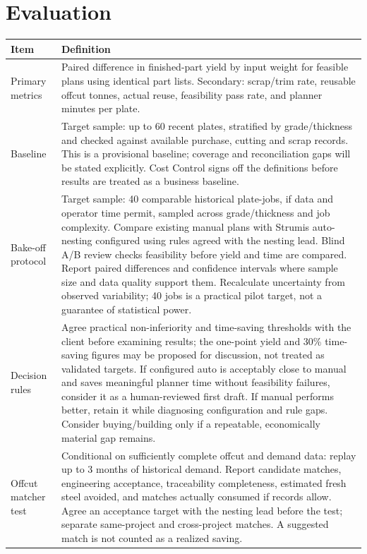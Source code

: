 \documentclass[10pt,a4paper]{article}
\begin{document}
\section{Evaluation}
\small
\begin{tabular}{@{}P{3.0cm}P{12.9cm}@{}}
\toprule
\textbf{Item} & \textbf{Definition} \\
\midrule
Primary metrics & Paired difference in finished-part yield by input weight for feasible plans using identical part lists. Secondary: scrap/trim rate, reusable offcut tonnes, actual reuse, feasibility pass rate, and planner minutes per plate. \\
Baseline & Target sample: up to 60 recent plates, stratified by grade/thickness and checked against available purchase, cutting and scrap records. This is a provisional baseline; coverage and reconciliation gaps will be stated explicitly. Cost Control signs off the definitions before results are treated as a business baseline. \\
Bake-off protocol & Target sample: 40 comparable historical plate-jobs, if data and operator time permit, sampled across grade/thickness and job complexity. Compare existing manual plans with Strumis auto-nesting configured using rules agreed with the nesting lead. Blind A/B review checks feasibility before yield and time are compared. Report paired differences and confidence intervals where sample size and data quality support them. Recalculate uncertainty from observed variability; 40 jobs is a practical pilot target, not a guarantee of statistical power. \\
Decision rules & Agree practical non-inferiority and time-saving thresholds with the client before examining results; the one-point yield and 30\% time-saving figures may be proposed for discussion, not treated as validated targets. If configured auto is acceptably close to manual and saves meaningful planner time without feasibility failures, consider it as a human-reviewed first draft. If manual performs better, retain it while diagnosing configuration and rule gaps. Consider buying/building only if a repeatable, economically material gap remains. \\
Offcut matcher test & Conditional on sufficiently complete offcut and demand data: replay up to 3 months of historical demand. Report candidate matches, engineering acceptance, traceability completeness, estimated fresh steel avoided, and matches actually consumed if records allow. Agree an acceptance target with the nesting lead before the test; separate same-project and cross-project matches. A suggested match is not counted as a realized saving. \\

\end{tabular}
\end{document}
